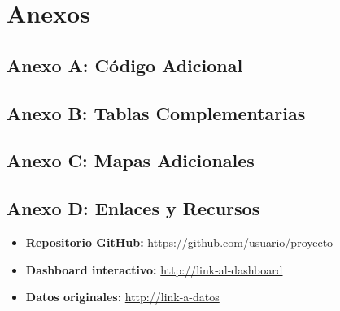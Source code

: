 \section{Anexos}

\subsection{Anexo A: Código Adicional}


\subsection{Anexo B: Tablas Complementarias}


\subsection{Anexo C: Mapas Adicionales}


\subsection{Anexo D: Enlaces y Recursos}

\begin{itemize}
    \item \textbf{Repositorio GitHub:} \url{https://github.com/usuario/proyecto}
    \item \textbf{Dashboard interactivo:} \url{http://link-al-dashboard}
    \item \textbf{Datos originales:} \url{http://link-a-datos}
\end{itemize}

